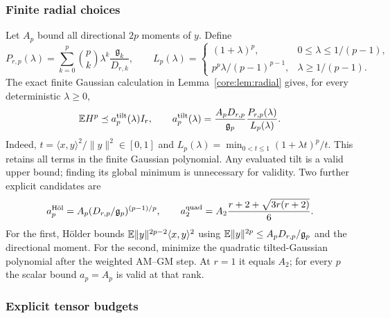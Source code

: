 \documentclass[11pt,a4paper]{article}
\theoremstyle{definition}\newtheorem{definition}[theorem]{Definition}
\theoremstyle{remark}\newtheorem{remark}[theorem]{Remark}
\numberwithin{equation}{section}
\newcommand{\gmom}{\mathfrak g}
\newcommand{\norm}[1]{\lVert#1\rVert}\newcommand{\ip}[2]{\langle#1,#2\rangle}
\begin{document}
\subsubsection{Finite radial choices}
\label{core:sec:finite-radial}
Let $A_p$ bound all directional $2p$ moments of $y$. Define
\[
 P_{r,p}(\lambda)=\sum_{k=0}^p\binom pk\lambda^k
                     \frac{\gmom_k}{D_{r,k}},\qquad
 L_p(\lambda)=
 \begin{cases}
  (1+\lambda)^p,&0\le\lambda\le1/(p-1),\\
  p^p\lambda/(p-1)^{p-1},&\lambda\ge1/(p-1).
 \end{cases}
\]
The exact finite Gaussian calculation in Lemma~\ref{core:lem:radial}
gives, for every deterministic $\lambda\ge0$,
\begin{equation}\label{core:eq:finite-tilt}
 \E H^p\preceq a_p^{\rm tilt}(\lambda)I_r,\qquad
 a_p^{\rm tilt}(\lambda)=
 \frac{A_pD_{r,p}}{\gmom_p}
       \frac{P_{r,p}(\lambda)}{L_p(\lambda)}.
\end{equation}
Indeed, $t=\ip xy^2/\norm y^2\in[0,1]$ and
$L_p(\lambda)=\min_{0<t\le1}(1+\lambda t)^p/t$.
This retains all terms in the finite Gaussian polynomial.
Any evaluated tilt is a valid upper bound; finding its global minimum
is unnecessary for validity. Two further explicit candidates are
\begin{equation}\label{core:eq:holder-quad}
 a_p^{\rm H\ddot{o}l}=A_p(D_{r,p}/\gmom_p)^{(p-1)/p},\qquad
 a_2^{\rm quad}=A_2\frac{r+2+\sqrt{3r(r+2)}}6.
\end{equation}
For the first, H\"older bounds
$\E\norm y^{2p-2}\ip xy^2$ using
$\E\norm y^{2p}\le A_pD_{r,p}/\gmom_p$ and the directional moment.
For the second, minimize the quadratic tilted-Gaussian polynomial
after the weighted AM--GM step. At $r=1$ it equals $A_2$;
for every $p$ the scalar bound $a_p=A_p$ is valid at that rank.

\subsubsection{Explicit tensor budgets}
\end{document}
